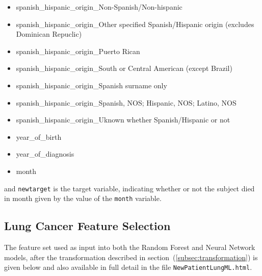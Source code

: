 \documentclass[a4paper,11pt]{article}
\newcommand{\codewhite}[1]{\colorbox{white}{\texttt{#1}}}
\begin{document}
\begin{itemize}[noitemsep]
\item spanish\_hispanic\_origin\_Non-Spanish/Non-hispanic
\item spanish\_hispanic\_origin\_Other specified Spanish/Hispanic origin (excludes Dominican Repuclic)
\item spanish\_hispanic\_origin\_Puerto Rican
\item spanish\_hispanic\_origin\_South or Central American (except Brazil)
\item spanish\_hispanic\_origin\_Spanish surname only
\item spanish\_hispanic\_origin\_Spanish, NOS; Hispanic, NOS; Latino, NOS
\item spanish\_hispanic\_origin\_Uknown whether Spanish/Hispanic or not
\item year\_of\_birth
\item year\_of\_diagnosis
\item month
\end{itemize}

and 
\codewhite{newtarget} is the target variable, indicating whether or not the subject died in month given by the value of the \codewhite{month} variable.

\subsection{Lung Cancer Feature Selection}
\label{subsec:lungfeatures}

The feature set used as input into both the Random Forest and Neural Network models, after the transformation described in section~(\ref{subsec:transformation}) is given below and also available in full detail in the file 
\codewhite{NewPatientLungML.html}.
\end{document}
